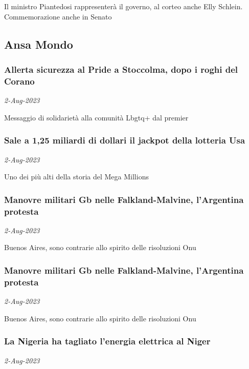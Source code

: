 Il ministro Piantedosi rappresenter\`{a} il governo, al corteo anche Elly Schlein. Commemorazione anche in Senato
\subsection{Ansa Mondo \href{https://www.ansa.it/sito/notizie/mondo/mondo.shtml}{}}
\subsubsection{Allerta sicurezza al Pride a Stoccolma, dopo i roghi del Corano \href{https://www.ansa.it/sito/notizie/mondo/europa/2023/08/02/allerta-sicurezza-al-pride-a-stoccolma-dopo-i-roghi-del-corano_14359c0d-790c-4f98-ae45-dcfd1209cc18.html}{}}
\textit{2-Aug-2023}

Messaggio di solidariet\`{a} alla comunit\`{a} Lbgtq+ dal premier
\subsubsection{Sale a 1,25 miliardi di dollari il jackpot della lotteria Usa \href{https://www.ansa.it/sito/notizie/mondo/nordamerica/2023/08/02/sale-a-125-miliardi-di-dollari-il-jackpot-della-lotteria-usa_62ac41eb-0f6b-468f-99ce-4a8dfb35489c.html}{}}
\textit{2-Aug-2023}

Uno dei pi\`{u} alti della storia del Mega Millions
\subsubsection{Manovre militari Gb nelle Falkland-Malvine, l'Argentina protesta \href{https://www.ansa.it/sito/notizie/mondo/americalatina/2023/08/02/manovre-militari-gb-nelle-falkland-malvine-largentina-protesta_ef6498ff-b454-47a8-827c-c20b1c541b6c.html}{}}
\textit{2-Aug-2023}

Buenos Aires, sono contrarie allo spirito delle risoluzioni Onu
\subsubsection{Manovre militari Gb nelle Falkland-Malvine, l'Argentina protesta \href{https://www.ansa.it/sito/notizie/mondo/2023/08/02/manovre-militari-gb-nelle-falkland-malvine-largentina-protesta_54b5eed1-f342-45e9-b7bf-8639645a36a9.html}{}}
\textit{2-Aug-2023}

Buenos Aires, sono contrarie allo spirito delle risoluzioni Onu
\subsubsection{La Nigeria ha tagliato l'energia elettrica al Niger \href{https://www.ansa.it/sito/notizie/mondo/africa/2023/08/02/la-nigeria-ha-tagliato-lenergia-elettrica-al-niger_310a6539-3b10-44b4-a401-461bad661654.html}{}}
\textit{2-Aug-2023}

